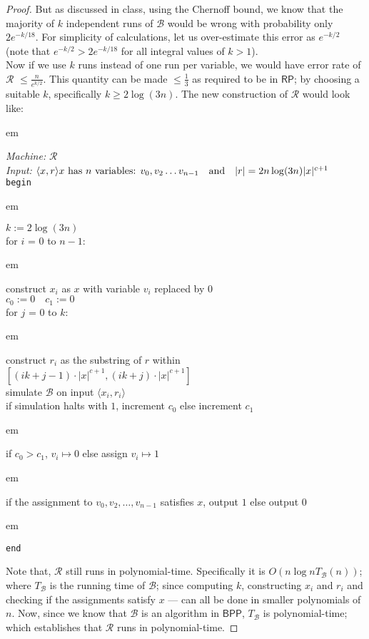 \documentclass[usletter]{article}
\newcommand {\machine}[1]      {\ensuremath{\mathscr{#1}}}
\newcommand {\family}[1]       {\ensuremath{\mathsf{#1}}}
\newcommand {\indpar}[1]   {
  \par\leftskip=#1em
  \noindent\ignorespaces
}
\newenvironment{turing}[2] {
  \smallskip
  \indpar{2}
  \textit{Machine:} #1\\
  \textit{Input:} $#2$\\[5pt]
  \texttt{begin}
  \parskip=0pt
  \indpar{3}
}{
  \indpar{2}
  \texttt{end}
  \par\medskip
}
\newcommand {\RP}     {\family{RP}}
\newcommand {\BPP}    {\family{BPP}}
\begin{document}
\begin{enumerate}[labelsep=2.5em, label=\textbf{\arabic{enumi}}]
\begin{proof}
    But as discussed in class, using the Chernoff bound, we know that the
    majority of $k$ independent runs of \machine{B} would be wrong with
    probability only $2e^{-k/18}$. For simplicity of calculations, let us
    over-estimate this error as $e^{-k/2}$ (note that $e^{-k/2} > 2e^{-k/18}$
    for all integral values of $k > 1$).\\
    Now if we use $k$ runs instead of one run per variable, we would have error
    rate of \machine{R} $\leq \frac{n}{e^{k/2}}$. This quantity can be made
    $\leq \frac{1}{3}$ as required to be in \RP; by choosing a suitable $k$,
    specifically $k \geq 2\log(3n)$. The new construction of \machine{R}
    would look like:
    \begin{turing}
          {\machine{R}}
          {\langle x, r \rangle
            \hfill x \text{ has } n \text{ variables: } v_0, v_2 \ldots v_{n-1}
            \quad \text{and} \quad |r| = 2n\log(3n)|x|^{c+1}}
      $k := 2\log(3n)$ \\
      for $i$ = $0$ to $n-1$:
        \indpar{4}
        construct $x_i$ as $x$ with variable $v_i$ replaced by $0$ \\
        $c_0 := 0 \quad c_1 := 0$ \\
        for $j$ = $0$ to $k$:
          \indpar{5}
          construct $r_i$ as the substring of $r$ within
            $[(ik+j-1) \cdot |x|^{c+1}, (ik+j) \cdot |x|^{c+1}]$ \\
          simulate \machine{B} on input $\langle x_i, r_i \rangle$ \\
          if simulation halts with $1$, increment $c_0$ else increment $c_1$
        \indpar{4}
        if $c_0 > c_1$, $v_i \mapsto 0$ else assign $v_i \mapsto 1$
      \indpar{3}
      if the assignment to $v_0, v_2, \ldots , v_{n-1}$ satisfies $x$,
        output $1$ else output $0$
    \end{turing}

    Note that, \machine{R} still runs in polynomial-time. Specifically it is
    $O(n\log{n}T_\machine{B}(n))$; where $T_\machine{B}$ is the running time of
    \machine{B}; since computing $k$, constructing $x_i$ and $r_i$ and checking
    if the assignments satisfy $x$ --- can all be done in smaller polynomials of
    $n$. Now, since we know that \machine{B} is an algorithm in \BPP,
    $T_\machine{B}$ is polynomial-time; which establishes that \machine{R} runs
    in polynomial-time.


\end{proof}
\end{enumerate}
\end{document}
